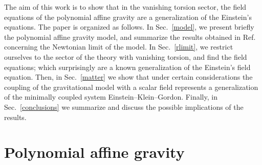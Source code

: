 \documentclass[aps,prd,12pt,twocolumn,superscriptaddress,showpacs,showkeys,reprint,longbibliography]{revtex4-1}
\renewcommand{\(}{\left(}
\renewcommand{\)}{\right)}
\renewcommand{\[}{\left[}
\renewcommand{\]}{\right]}
\begin{document}
The aim of this work is to show that in the vanishing torsion sector, the field equations of the polynomial affine gravity are a generalization of the Einstein's equations. %
The paper is organized as follows. In Sec.~\ref{model}, we present briefly the polynomial affine gravity model, and summarize the results obtained in Ref.~\cite{Skirzewski:2014eta} concerning the Newtonian limit of the model. In Sec.~\ref{rlimit}, we restrict ourselves to the sector of the theory with vanishing torsion, and find the field equations; which surprisingly are a known generalization of the Einstein's field equation. Then, in Sec.~\ref{matter} we show that under certain considerations the coupling of the gravitational model with a scalar field represents a generalization of the minimally coupled system Einstein--Klein--Gordon. Finally, in Sec.~\ref{conclusions} we summarize and discuss the possible implications of the results.

\section{\label{model}Polynomial affine gravity}
\end{document}
